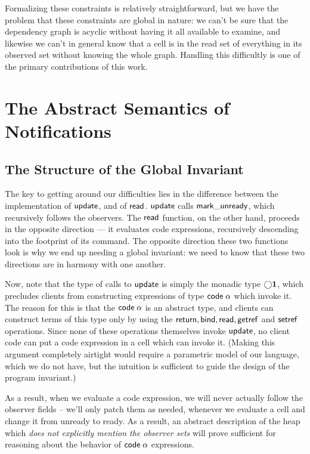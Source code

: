 Formalizing these constraints is relatively straightforward, but we
have the problem that these constraints are global in nature:
we can't be sure that the dependency graph is acyclic without having
it all available to examine, and likewise we can't in general know
that a cell is in the read set of everything in its observed set
without knowing the whole graph. Handling this difficultly is one of
the primary contributions of this work. 

\section{The Abstract Semantics of Notifications}

\subsection{The Structure of the Global Invariant}

The key to getting around our difficulties lies in the difference
between the implementation of $\mathsf{update}$, and of $\mathsf{read}$.
$\mathsf{update}$ calls $\mathsf{mark\_unready}$, which recursively follows
the observers. The $\mathsf{read}$ function, on the other hand,
proceeds in the opposite direction --- it evaluates code expressions,
recursively descending into the footprint of its command. The opposite
direction these two functions look is why we end up needing a global
invariant: we need to know that these two directions are in harmony
with one another.

Now, note that the type of calls to $\mathsf{update}$ is simply the
monadic type $\bigcirc{\mathbf{1}}$, which precludes clients from
constructing expressions of type $\mathsf{code}\;{\alpha}$ which invoke
it. The reason for this is that the $\mathsf{code}\;{\alpha}$ is an abstract
type, and clients can construct terms of this type only by using the
$\mathsf{return}, \mathsf{bind}, \mathsf{read}, \mathsf{getref}$ and
$\mathsf{setref}$ operations. Since none of these operations themselves
invoke $\mathsf{update}$, no client code can put a code expression in a
cell which can invoke it. (Making this argument completely airtight
would require a parametric model of our language, which we do not
have, but the intuition is sufficient to guide the design of the
program invariant.)

As a result, when we evaluate a code expression, we will never
actually follow the observer fields -- we'll only patch them as
needed, whenever we evaluate a cell and change it from unready to
ready.  As a result, an abstract description of the heap which
\emph{does not explicitly mention the observer sets} will prove
sufficient for reasoning about the behavior of $\mathsf{code}\;{\alpha}$
expressions.

